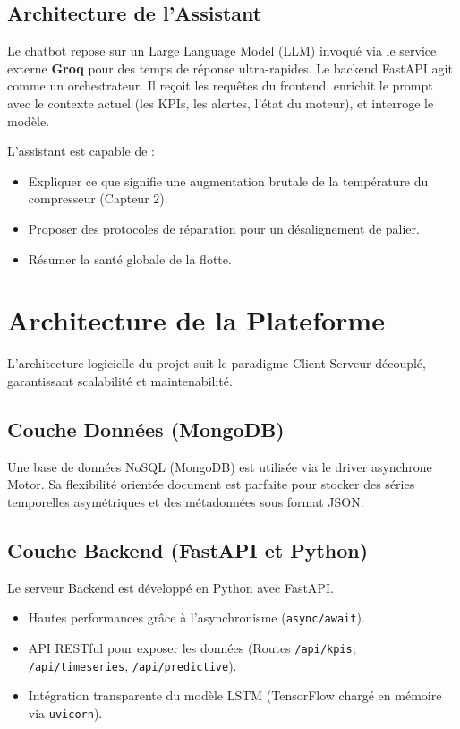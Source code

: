 \documentclass[12pt,a4paper]{report}
\begin{document}
\section{Architecture de l'Assistant}
Le chatbot repose sur un Large Language Model (LLM) invoqué via le service externe \textbf{Groq} pour des temps de réponse ultra-rapides. Le backend FastAPI agit comme un orchestrateur. Il reçoit les requêtes du frontend, enrichit le prompt avec le contexte actuel (les KPIs, les alertes, l'état du moteur), et interroge le modèle.

L'assistant est capable de :
\begin{itemize}
    \item Expliquer ce que signifie une augmentation brutale de la température du compresseur (Capteur 2).
    \item Proposer des protocoles de réparation pour un désalignement de palier.
    \item Résumer la santé globale de la flotte.
\end{itemize}

\newpage

\chapter{Architecture de la Plateforme}

L'architecture logicielle du projet suit le paradigme Client-Serveur découplé, garantissant scalabilité et maintenabilité.

\section{Couche Données (MongoDB)}
Une base de données NoSQL (MongoDB) est utilisée via le driver asynchrone Motor. Sa flexibilité orientée document est parfaite pour stocker des séries temporelles asymétriques et des métadonnées sous format JSON. 

\section{Couche Backend (FastAPI et Python)}
Le serveur Backend est développé en Python avec FastAPI.
\begin{itemize}
    \item Hautes performances grâce à l'asynchronisme (\texttt{async/await}).
    \item API RESTful pour exposer les données (Routes \texttt{/api/kpis}, \texttt{/api/timeseries}, \texttt{/api/predictive}).
    \item Intégration transparente du modèle LSTM (TensorFlow chargé en mémoire via \texttt{uvicorn}).
\end{itemize}
\end{document}
